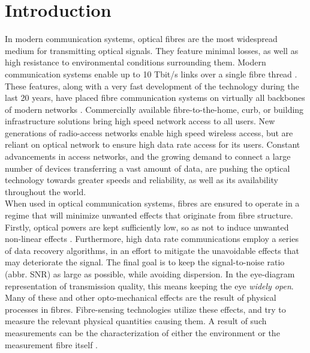 \documentclass{standalone}
\begin{document}
\chapter{Introduction}
\setcounter{page}\thestranica


In modern communication systems, optical fibres are the most widespread medium for transmitting optical signals. They feature minimal losses, as well as high resistance to environmental conditions surrounding them. Modern communication systems enable up to 10 Tbit/s links over a single fibre thread \cite{Hecht2015}. These features, along with a very fast development of the technology during the last 20 years, have placed fibre communication systems on virtually all backbones of modern networks \cite{fer:oks}. Commercially available fibre-to-the-home, curb, or building infrastructure solutions bring high speed network access to all users. New generations of radio-access networks enable high speed wireless access, but are reliant on optical network to ensure high data rate access for its users. Constant advancements in access networks, and the growing demand to connect a large number of devices transferring a vast amount of data, are pushing the optical technology towards greater speeds and reliability, as well as its availability throughout the world. \\

When used in optical communication systems, fibres are ensured to operate in a regime that will minimize unwanted effects that originate from fibre structure. Firstly, optical powers are kept sufficiently low, so as not to induce unwanted non-linear effects \cite{agrawal}\cite{chalmers:foc}. Furthermore, high data rate communications employ a series of data recovery algorithms, in an effort to mitigate the unavoidable effects that may deteriorate the signal. The final goal is to keep the signal-to-noise ratio (abbr. SNR) as large as possible, while avoiding dispersion. In the eye-diagram representation of transmission quality, this means keeping the eye \textit{widely open}. Many of these and other opto-mechanical effects are the result of physical processes in fibres. Fibre-sensing technologies utilize these effects, and try to measure the relevant physical quantities causing them. A result of such measurements can be the characterization of either the environment or the measurement fibre itself \cite{krohnFundamentals}. \\
\end{document}
